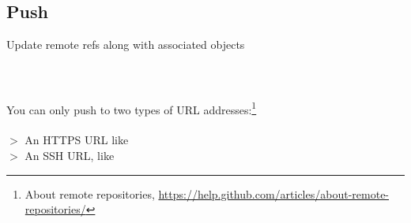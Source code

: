 
\subsection{Push}

Update remote refs along with associated objects
\\
\\
\\
\\
You can only push to two types of URL addresses:\footnote{About remote repositories,
\href{https://help.github.com/articles/about-remote-repositories/}{https://help.github.com/articles/about-remote-repositories/}}
\\
\\
$>$ An HTTPS URL like \\
$>$ An SSH URL, like \\
